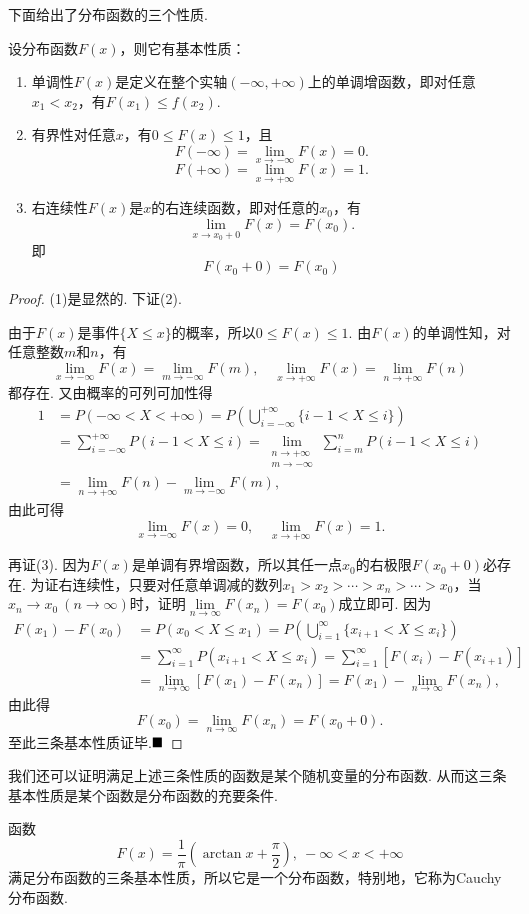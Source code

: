 \documentclass[lang=cn,10pt]{elegantbook}
\begin{document}
下面给出了分布函数的三个性质.
\begin{theorem}[分布函数的基本性质]
	设分布函数$F(x)$，则它有基本性质：
	\begin{enumerate}[(1)]
		\item {\heiti 单调性}\qquad $F(x)$是定义在整个实轴$(-\infty,+\infty)$上的单调增函数，即对任意$x_1<x_2$，有$F(x_1)\leqslant f(x_2)$.
		\item {\heiti 有界性}\qquad 对任意$x$，有$0\leqslant F(x)\leqslant 1$，且
		$$F(-\infty)=\lim\limits_{x\to -\infty}F(x)=0.$$
		$$F(+\infty)=\lim\limits_{x\to +\infty}F(x)=1.$$
		\item {\heiti 右连续性}\qquad $F(x)$是$x$的右连续函数，即对任意的$x_0$，有
		$$\lim\limits_{x\to x_0+0}F(x)=F(x_0).$$
		即
		$$F(x_0+0)=F(x_0)$$
	\end{enumerate}
\end{theorem}
\begin{proof}
	(1)是显然的. 下证(2).
	
	由于$F(x)$是事件$\{X\leqslant x\}$的概率，所以$0\leqslant F(x)\leqslant 1$. 由$F(x)$的单调性知，对任意整数$m$和$n$，有
	$$\lim\limits_{x\to -\infty}F(x)=\lim\limits_{m\to -\infty}F(m),\quad \lim\limits_{x\to +\infty}F(x)=\lim\limits_{n\to +\infty}F(n)$$
	都存在. 又由概率的可列可加性得
	\begin{align*}
		1&=P(-\infty<X<+\infty)=P\left(\bigcup_{i=-\infty}^{+\infty}\{i-1<X\leqslant i\}\right)\\
		&=\sum_{i=-\infty}^{+\infty}P(i-1<X\leqslant i)=\lim_{\substack{n\to +\infty\\ m\to -\infty}}\sum_{i=m}^{n}P(i-1<X\leqslant i)\\
		&=\lim\limits_{n\to +\infty}F(n)-\lim\limits_{m\to -\infty}F(m),
	\end{align*}
	由此可得
	$$\lim\limits_{x\to -\infty}F(x)=0,\quad \lim\limits_{x\to +\infty}F(x)=1.$$
	
	再证(3). 因为$F(x)$是单调有界增函数，所以其任一点$x_0$的右极限$F(x_0+0)$必存在. 为证右连续性，只要对任意单调减的数列$x_1>x_2>\cdots>x_n>\cdots>x_0$，当$x_n\to x_0\ (n\to\infty)$时，证明$\lim\limits_{n\to\infty}F(x_n)=F(x_0)$成立即可. 因为
	\begin{align*}
		F(x_1)-F(x_0)&=P(x_0<X\leqslant x_1)=P\left(\bigcup_{i=1}^{\infty}\{x_{i+1}<X\leqslant x_i\}\right)\\
		&=\sum_{i=1}^{\infty}P(x_{i+1}<X\leqslant x_i)=\sum_{i=1}^{\infty}\left[F(x_i)-F(x_{i+1})\right]\\
		&=\lim\limits_{n\to\infty}\left[F(x_1)-F(x_n)\right]=F(x_1)-\lim\limits_{n\to\infty}F(x_n),
	\end{align*}
	由此得
	$$F(x_0)=\lim\limits_{n\to\infty}F(x_n)=F(x_0+0).$$
	至此三条基本性质证毕.$\hfill\blacksquare$
\end{proof}
我们还可以证明满足上述三条性质的函数是某个随机变量的分布函数. 从而这三条基本性质是某个函数是分布函数的充要条件.
\begin{example}
	函数
	$$F(x)=\frac{1}{\pi}\left(\arctan x+\frac{\pi}{2}\right),\ -\infty<x<+\infty$$
	满足分布函数的三条基本性质，所以它是一个分布函数，特别地，它称为{\heiti Cauchy分布函数}.
\end{example}
\end{document}
